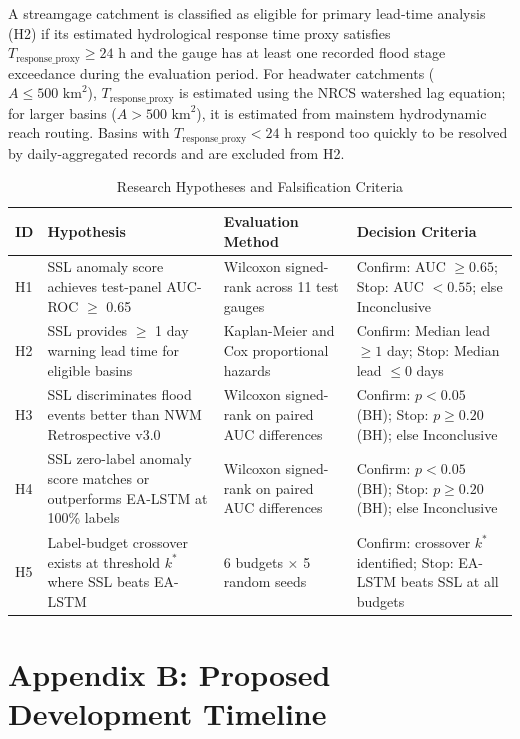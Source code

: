 \documentclass[12pt]{report}
\begin{document}
A streamgage catchment is classified as eligible for primary lead-time analysis (H2) if its estimated hydrological response time proxy satisfies $T_{\text{response\_proxy}} \ge 24\text{ h}$ and the gauge has at least one recorded flood stage exceedance during the evaluation period. For headwater catchments ($A \le 500\text{ km}^2$), $T_{\text{response\_proxy}}$ is estimated using the NRCS watershed lag equation; for larger basins ($A > 500\text{ km}^2$), it is estimated from mainstem hydrodynamic reach routing. Basins with $T_{\text{response\_proxy}} < 24\text{ h}$ respond too quickly to be resolved by daily-aggregated records and are excluded from H2.

\begin{table}[h]
  \caption{Research Hypotheses and Falsification Criteria}
  \label{tab:hypotheses}
  \centering
  \begin{tabular}{|p{0.8cm}|p{4.6cm}|p{3.2cm}|p{3.2cm}|}
    \hline
    \textbf{ID} & \textbf{Hypothesis} & \textbf{Evaluation Method} & \textbf{Decision Criteria} \\
    \hline
    H1 & SSL anomaly score achieves test-panel AUC-ROC $\ge$ 0.65 & Wilcoxon signed-rank across 11 test gauges & Confirm: AUC $\ge 0.65$; Stop: AUC $< 0.55$; else Inconclusive \\
    \hline
    H2 & SSL provides $\ge$ 1 day warning lead time for eligible basins & Kaplan-Meier and Cox proportional hazards & Confirm: Median lead $\ge 1$ day; Stop: Median lead $\le 0$ days \\
    \hline
    H3 & SSL discriminates flood events better than NWM Retrospective v3.0 & Wilcoxon signed-rank on paired AUC differences & Confirm: $p < 0.05$ (BH); Stop: $p \ge 0.20$ (BH); else Inconclusive \\
    \hline
    H4 & SSL zero-label anomaly score matches or outperforms EA-LSTM at 100\% labels & Wilcoxon signed-rank on paired AUC differences & Confirm: $p < 0.05$ (BH); Stop: $p \ge 0.20$ (BH); else Inconclusive \\
    \hline
    H5 & Label-budget crossover exists at threshold $k^*$ where SSL beats EA-LSTM & 6 budgets $\times$ 5 random seeds & Confirm: crossover $k^*$ identified; Stop: EA-LSTM beats SSL at all budgets \\
    \hline
  \end{tabular}
\end{table}

\section*{Appendix B: Proposed Development Timeline}
\end{document}
